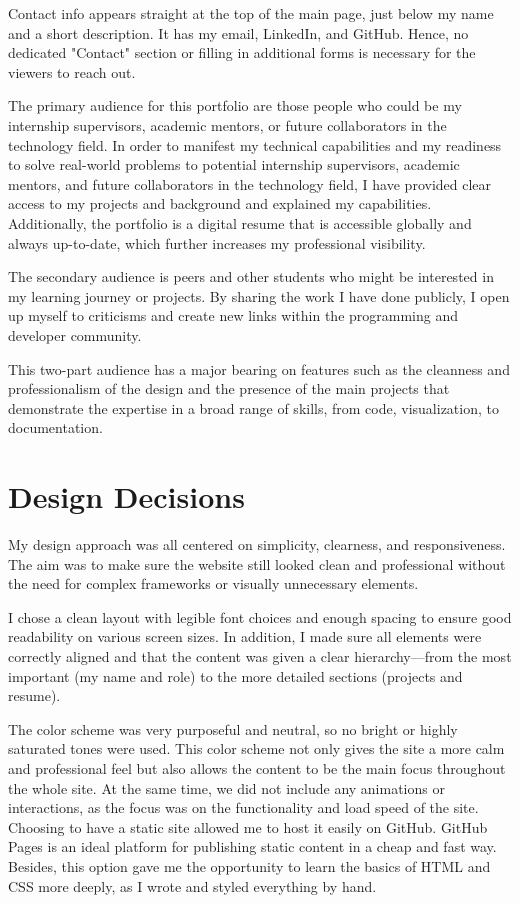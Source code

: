 \documentclass[12pt,a4paper]{article}
\begin{document}
Contact info appears straight at the top of the main page, just below my name and a short description. It has my email, LinkedIn, and GitHub. Hence, no dedicated "Contact" section or filling in additional forms is necessary for the viewers to reach out.

The primary audience for this portfolio are those people who could be my internship supervisors, academic mentors, or future collaborators in the technology field. In order to manifest my technical capabilities and my readiness to solve real-world problems to potential internship supervisors, academic mentors, and future collaborators in the technology field, I have provided clear access to my projects and background and explained my capabilities. Additionally, the portfolio is a digital resume that is accessible globally and always up-to-date, which further increases my professional visibility.

The secondary audience is peers and other students who might be interested in my learning journey or projects. By sharing the work I have done publicly, I open up myself to criticisms and create new links within the programming and developer community.

This two-part audience has a major bearing on features such as the cleanness and professionalism of the design and the presence of the main projects that demonstrate the expertise in a broad range of skills, from code, visualization, to documentation.


\section{Design Decisions}
My design approach was all centered on simplicity, clearness, and responsiveness. The aim was to make sure the website still looked clean and professional without the need for complex frameworks or visually unnecessary elements.

I chose a clean layout with legible font choices and enough spacing to ensure good readability on various screen sizes. In addition, I made sure all elements were correctly aligned and that the content was given a clear hierarchy—from the most important (my name and role) to the more detailed sections (projects and resume).

The color scheme was very purposeful and neutral, so no bright or highly saturated tones were used. This color scheme not only gives the site a more calm and professional feel but also allows the content to be the main focus throughout the whole site. At the same time, we did not include any animations or interactions, as the focus was on the functionality and load speed of the site.
Choosing to have a static site allowed me to host it easily on GitHub. GitHub Pages is an ideal platform for publishing static content in a cheap and fast way. Besides, this option gave me the opportunity to learn the basics of HTML and CSS more deeply, as I wrote and styled everything by hand.
\end{document}
